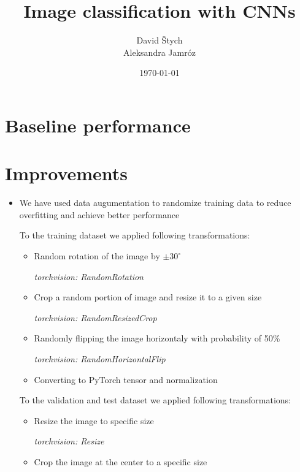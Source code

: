 \documentclass{article}
\title{Image classification with CNNs}
\author{David Štych\\ Aleksandra Jamróz}
\date{\today{}}
\begin{document}
\maketitle
\newpage


\section*{Baseline performance}


\section*{Improvements}

\begin{itemize}
\item We have used data augumentation to randomize training data to reduce overfitting and achieve better performance \cite{somewebsite}

To the training dataset we applied following transformations: 
\begin{itemize}
\item Random rotation of the image by $\pm30^{\circ}$

\textit{torchvision: RandomRotation} \cite{randomrotation}
\item Crop a random portion of image and resize it to a given size

\textit{torchvision: RandomResizedCrop} \cite{randomresizedcrop}
\item Randomly flipping the image horizontaly with probability of 50\%

\textit{torchvision: RandomHorizontalFlip} \cite{randomhorizontalflip}
\item Converting to PyTorch tensor and normalization
\end{itemize} 
To the validation and test dataset we applied following transformations: 
\begin{itemize}
\item Resize the image to specific size

\textit{torchvision: Resize} \cite{resize}
\item Crop the image at the center to a specific size


\end{itemize}
\end{itemize}
\end{document}
